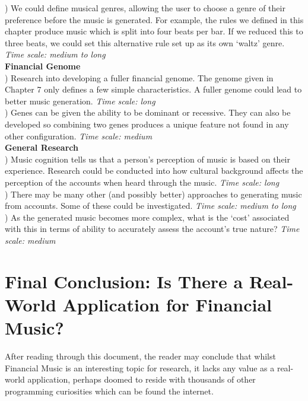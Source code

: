 ) We could define musical genres, allowing the user to choose a genre of their preference before the music is generated. For example, the rules we defined in this chapter produce music which is split into four beats per bar. If we reduced this to three beats, we could set this alternative rule set up as its own `waltz' genre. \textit{Time scale: medium to long} \\

\noindent \textbf{Financial Genome} \\

) Research into developing a fuller financial genome. The genome given in Chapter 7 only defines a few simple characteristics. A fuller genome could lead to better music generation. \textit{Time scale: long} \\

) Genes can be given the ability to be dominant or recessive. They can also be developed so combining two genes produces a unique feature not found in any other configuration. \textit{Time scale: medium} \\

\noindent \textbf{General Research} \\

) Music cognition tells us that a person's perception of music is based on their experience. Research could be conducted into how cultural background affects the perception of the accounts when heard through the music. \textit{Time scale: long} \\

) There may be many other (and possibly better) approaches to generating music from accounts. Some of these could be investigated. \textit{Time scale: medium to long} \\

) As the generated music becomes more complex, what is the `cost' associated with this in terms of ability to accurately assess the account's true nature? \textit{Time scale: medium} \\


\section{Final Conclusion: Is There a Real-World Application for Financial Music?}

After reading through this document, the reader may conclude that whilst Financial Music is an interesting topic for research, it lacks any value as a real-world application, perhaps doomed to reside with thousands of other programming curiosities which can be found the internet.

